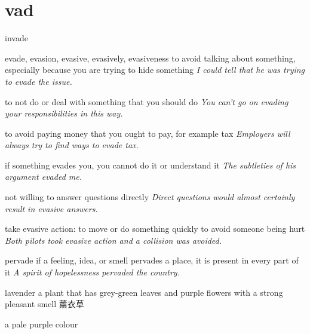 \chapter{vad}

\begin{word}{invade}
\end{word}



\begin{word}{evade, evasion, evasive, evasively, evasiveness}
    to avoid talking about something, especially because you are trying to hide something
    \textit{I could tell that he was trying to evade the issue.}

    to not do or deal with something that you should do
    \textit{You can’t go on evading your responsibilities in this way.}

    to avoid paying money that you ought to pay, for example tax
    \textit{Employers will always try to find ways to evade tax.}

    if something evades you, you cannot do it or understand it
    \textit{The subtleties of his argument evaded me.}

    not willing to answer questions directly
    \textit{Direct questions would almost certainly result in evasive answers.}

    take evasive action: to move or do something quickly to avoid someone being hurt
    \textit{Both pilots took evasive action and a collision was avoided.}
\end{word}

\begin{word}{pervade}
    if a feeling, idea, or smell pervades a place, it is present in every part of it
    \textit{A spirit of hopelessness pervaded the country.}
\end{word}

\begin{word}{lavender}
    a plant that has grey-green leaves and purple flowers with a strong pleasant smell 薰衣草

    a pale purple colour
\end{word}